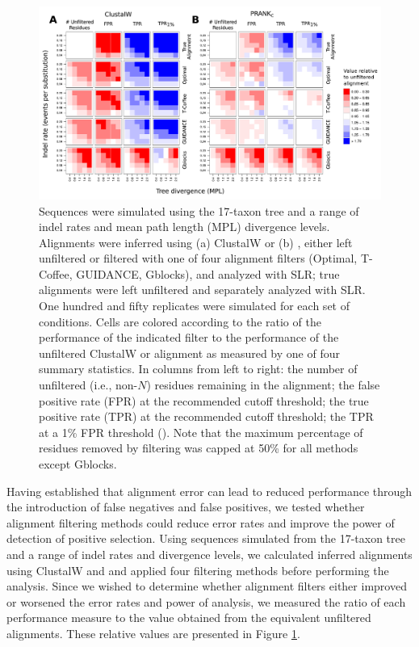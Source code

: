 \documentclass{article}
\begin{document}
\begin{figure}[t]
\begin{center}
\includegraphics[scale=0.65]{fig5.pdf}
\end{center}
\caption{Sequences were simulated using the 17-taxon tree and a range
  of indel rates and mean path length (MPL) divergence
  levels. Alignments were inferred using (a) ClustalW or (b) \prankc,
  either left unfiltered or filtered with one of four alignment
  filters (Optimal, T-Coffee, GUIDANCE, Gblocks), and analyzed with
  SLR; true alignments were left unfiltered and separately analyzed
  with SLR. One hundred and fifty replicates were simulated for each
  set of conditions. Cells are colored according to the ratio of the
  performance of the indicated filter to the performance of the
  unfiltered ClustalW or \prankc alignment as measured by one of four
  summary statistics. In columns from left to right: the number of
  unfiltered (i.e., non-$N$) residues remaining in the alignment; the
  false positive rate (FPR) at the recommended cutoff threshold; the
  true positive rate (TPR) at the recommended cutoff threshold; the
  TPR at a 1\% FPR threshold (\tpr). Note that the maximum percentage
  of residues removed by filtering was capped at 50\% for all methods
  except Gblocks.}
\label{fig_5}
\end{figure}

Having established that alignment error can lead to reduced \sw
performance through the introduction of false negatives and false
positives, we tested whether alignment filtering methods
could reduce error rates and improve the power of \sw detection of
positive selection. Using sequences simulated from the 17-taxon tree
and a range of indel rates and divergence levels, we calculated
inferred alignments using ClustalW and \prankc and applied four
filtering methods before performing the \sw analysis. Since we wished
to determine whether alignment filters either improved or worsened the
error rates and power of \sw analysis, we measured the ratio of each
performance measure to the value obtained from the equivalent
unfiltered alignments. These relative values are presented in Figure
\ref{fig_5}.
\end{document}
